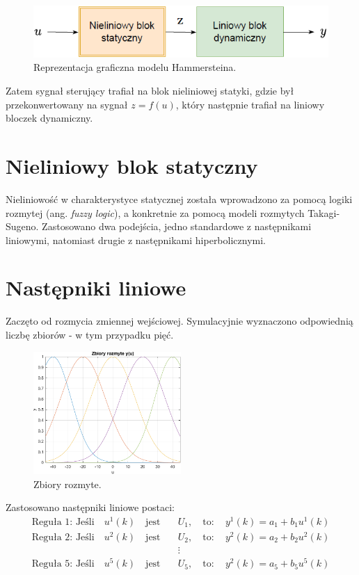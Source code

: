 \documentclass[a4paper,titlepage,11pt,floatssmall]{mwrep}
\begin{document}
\begin{figure}[h!]
\centering
\includegraphics[width=\textwidth]{pictures/hamm_model}
\caption{Reprezentacja graficzna modelu Hammersteina.}
\label{hamm_model}
\end{figure}

\noindent Zatem sygnał sterujący trafiał na blok nieliniowej statyki, gdzie był przekonwertowany na sygnał $z = f(u)$, który następnie trafiał na liniowy bloczek dynamiczny. 

\section{Nieliniowy blok statyczny}
Nieliniowość w charakterystyce statycznej została wprowadzono za pomocą logiki rozmytej (ang. \textit{fuzzy logic}), a konkretnie za pomocą modeli rozmytych Takagi-Sugeno. Zastosowano dwa podejścia, jedno standardowe z następnikami liniowymi, natomiast drugie z następnikami hiperbolicznymi.

\section{Następniki liniowe}
Zaczęto od rozmycia zmiennej wejściowej. Symulacyjnie wyznaczono odpowiednią liczbę zbiorów - w tym przypadku pięć.

\begin{figure}[h!]
\centering
\includegraphics[width=0.5\textwidth]{pictures/fuzzy_set_ham}
\caption{Zbiory rozmyte.}
\label{hamm_model}
\end{figure}

\noindent Zastosowano następniki liniowe postaci:
\begin{equation}
\begin{aligned}
\text{Reguła 1: Jeśli} \quad u^1(k) \quad \text{jest} \quad &U_1, \quad \text{to}: \quad y^1(k) = a_1 + b_1 u^1(k) \\
\text{Reguła 2: Jeśli} \quad u^2(k) \quad \text{jest} \quad &U_2, \quad \text{to}: \quad y^2(k) = a_2 + b_2 u^2(k) \\ 
&\vdots \\
\text{Reguła 5: Jeśli} \quad u^5(k) \quad \text{jest} \quad &U_5, \quad \text{to}: \quad y^2(k) = a_5 + b_5 u^5(k) \\
\end{aligned}
\label{nastepniki_lin}
\end{equation}
\end{document}
